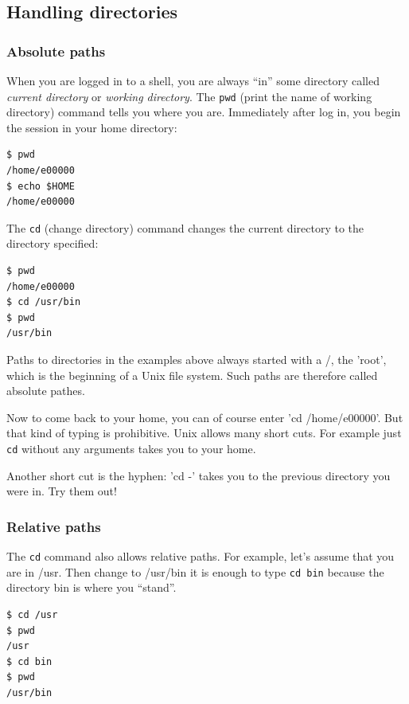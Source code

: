\documentclass[11pt,a4paper,twoside]{article}
\begin{document}
\subsection{Handling directories}

\subsubsection{Absolute paths}

When you are logged in to a shell, you are always ``in'' some directory
called \emph{current directory} or \emph{working directory}.
The \texttt{pwd} (print the name of working directory) command tells
you where you are. Immediately after log in, you begin the session in 
your home directory:

\begin{lstlisting}[frame=single]
$ pwd
/home/e00000
$ echo $HOME
/home/e00000
\end{lstlisting}

The \texttt{cd} (change directory) command changes the current directory
to the directory specified:

\begin{lstlisting}[frame=single]
$ pwd
/home/e00000
$ cd /usr/bin
$ pwd
/usr/bin
\end{lstlisting}

Paths to directories in the examples above always started with a /, the
'root', which is the beginning of a Unix file system. Such paths are 
therefore called absolute pathes.

Now to come back to your home, you can of course enter 'cd /home/e00000'. 
But that kind of typing is prohibitive. Unix allows many short cuts. For
example just \texttt{cd} without any arguments takes you to your home.

Another short cut is the hyphen: 'cd -' takes you to the previous directory
you were in. Try them out!


\subsubsection{Relative paths}

The \texttt{cd} command also allows relative paths. For example, let's
assume that you are in /usr. Then change to /usr/bin it is enough to
type \texttt{cd bin} because the directory bin is where you ``stand''.

\begin{lstlisting}[frame=single]
$ cd /usr
$ pwd
/usr
$ cd bin
$ pwd
/usr/bin
\end{lstlisting}
\end{document}
